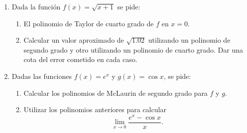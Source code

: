 \begin{enumerate}[leftmargin=*]
\item  Dada la función $f(x)=\sqrt{x+1}$ se pide:
\begin{enumerate}
    \item  El polinomio de Taylor de cuarto grado de $f$ en $x=0$.

    \item  Calcular un valor aproximado de $\sqrt{1.02}$ utilizando
    un polinomio de segundo grado y otro utilizando un polinomio de
    cuarto grado. Dar una cota del error cometido en cada caso.
\end{enumerate}

\item Dadas las funciones
$f(x)=e^x$ y $g(x)=\cos x$, se pide:
\begin{enumerate}
   \item  Calcular los polinomios de McLaurin de segundo grado para $f$
   y $g$.

   \item  Utilizar los polinomios anteriores para calcular
   \[ \lim_{x\rightarrow 0}\frac{e^x-\cos x}{x}.\]
\end{enumerate}
\end{enumerate}
